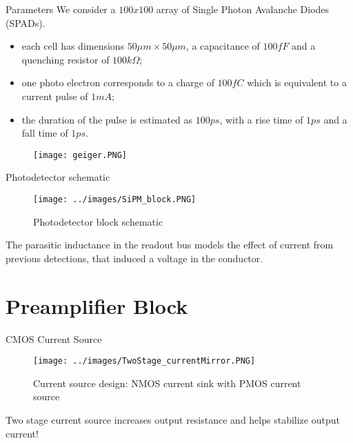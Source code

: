 \documentclass[aspectratio=169,xcolor=dvipsnames]{beamer}
\begin{document}
	\begin{frame}{Parameters}
		We consider a $100x100$ array of Single Photon Avalanche Diodes (SPADs).
		
		\begin{itemize}
			\item each cell has dimensions $50\mu m \times 50\mu m$, a capacitance of $100fF$ and a quenching resistor of $100k\Omega$;
			\item one photo electron corresponds to a charge of $100fC$ which is equivalent to a current pulse of $1mA$;
			\item the duration of the pulse is estimated as $100ps$, with a rise time of $1ps$ and a fall time of $1ps$.
		\end{itemize}
		
		\begin{figure}[h!]
			\centering
			\texttt{[image: geiger.PNG]}
		\end{figure}
 	\end{frame}	
 	
 	\begin{frame}{Photodetector schematic}
 		\begin{figure}[h]
 			\centering
 			\texttt{[image: ../images/SiPM\_block.PNG]}
 			\caption{Photodetector block schematic}
 		\end{figure}
 		\begin{block}{}
 			The parasitic inductance in the readout bus models the effect of current from previous detections, that induced a voltage in the conductor.
 		\end{block}
 	\end{frame}

	\section{Preamplifier Block}
	
	\begin{frame}{CMOS Current Source}
		\begin{figure}[h!]
			\centering
			\texttt{[image: ../images/TwoStage\_currentMirror.PNG]}
			\label{Current_Source}
			\caption{Current source design: NMOS current sink with PMOS current source}
		\end{figure}
		\begin{block}{}
			Two stage current source increases output resistance and helps stabilize output current!
		\end{block}
	\end{frame}
	
\end{document}
